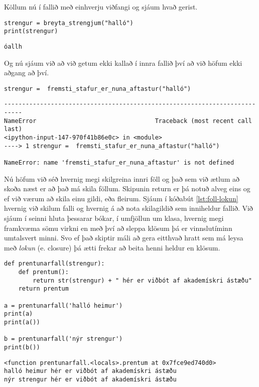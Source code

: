 Köllum nú í fallið með einhverju viðfangi og sjáum hvað gerist.

\begin{lstlisting}[caption=Innri föll kynnt, label=lst:foll-innri-foll-ut1]
strengur = breyta_strengjum("halló")
print(strengur)
\end{lstlisting}
\lstset{style=uttak}
\begin{lstlisting}
óallh	
\end{lstlisting}
\lstset{style=venjulegt}

Og nú sjáum við að við getum ekki kallað í innra fallið því að við höfum ekki aðgang að því.

\begin{lstlisting}[caption=Innri föll kynnt, label=lst:foll-innri-foll-ut2]
strengur =  fremsti_stafur_er_nuna_aftastur("halló")
\end{lstlisting}
\lstset{style=uttak}
\begin{lstlisting}
---------------------------------------------------------------------------
NameError                                 Traceback (most recent call last)
<ipython-input-147-970f41b86e0c> in <module>
----> 1 strengur =  fremsti_stafur_er_nuna_aftastur("halló")

NameError: name 'fremsti_stafur_er_nuna_aftastur' is not defined
\end{lstlisting}
\lstset{style=venjulegt}


Nú höfum við séð hvernig megi skilgreina innri föll og það sem við ætlum að skoða næst er að það má skila föllum.
Skipunin return er þá notuð alveg eins og ef við værum að skila einu gildi, eða fleirum.
Sjáum í kóðabút \ref{lst:foll-lokun} hvernig við skilum falli og hvernig á að nota skilagildið sem inniheldur fallið.
Við sjáum í seinni hluta þessarar bókar, í umfjöllun um klasa, hvernig megi framkvæma sömu virkni en með því að sleppa klösum þá er vinnslutíminn umtalsvert minni.
Svo ef það skiptir máli að gera eitthvað hratt sem má leysa með \emph{lokun} (e. closure) þá ætti frekar að beita henni heldur en klösum.

\begin{lstlisting}[caption=Lokun kynnt, label=lst:foll-lokun]
def prentunarfall(strengur):
	def prentum():
		return str(strengur) + " hér er viðbót af akademískri ástæðu"
	return prentum
	
a = prentunarfall('halló heimur')
print(a) 
print(a())

b = prentunarfall('nýr strengur')
print(b())
\end{lstlisting}
\lstset{style=uttak}
\begin{lstlisting}
<function prentunarfall.<locals>.prentum at 0x7fce9ed740d0>
halló heimur hér er viðbót af akademískri ástæðu
nýr strengur hér er viðbót af akademískri ástæðu
\end{lstlisting}
\lstset{style=venjulegt}

